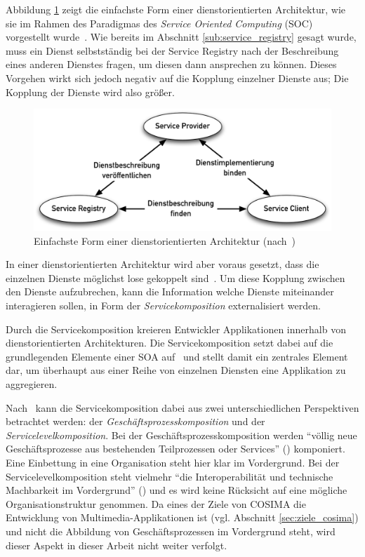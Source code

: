   Abbildung \ref{fig:images_Basic_SOA} zeigt die einfachste Form einer dienstorientierten Architektur, wie sie im Rahmen des Paradigmas des \emph{Service Oriented Computing} (SOC) vorgestellt wurde~\citep{service_oriented_computing}. Wie bereits im Abschnitt \ref{sub:service_registry} gesagt wurde, muss ein Dienst selbstständig bei der Service Registry nach der Beschreibung eines anderen Dienstes fragen, um diesen dann ansprechen zu können. Dieses Vorgehen wirkt sich jedoch negativ auf die Kopplung einzelner Dienste aus; Die Kopplung der Dienste wird also größer.
  
\begin{figure}[hb]
  \centering
    \includegraphics[width=.9\textwidth]{images/Basic_SOA.png}
  \caption{Einfachste Form einer dienstorientierten Architektur (nach~\citep{service_oriented_computing})}
  \label{fig:images_Basic_SOA}
\end{figure}

  In einer dienstorientierten Architektur wird aber voraus gesetzt, dass die einzelnen Dienste möglichst lose gekoppelt sind~\citep[S. 162]{soa_goes_real}. Um diese Kopplung zwischen den Dienste aufzubrechen, kann die Information welche Dienste miteinander interagieren sollen, in Form der \emph{Servicekomposition} externalisiert werden.

  Durch die Servicekomposition kreieren Entwickler Applikationen innerhalb von dienstorientierten Architekturen. Die Servicekomposition setzt dabei auf die grundlegenden Elemente einer SOA auf~\citep[S. 51]{milanovic2004csw} und stellt damit ein zentrales Element dar, um überhaupt aus einer Reihe von einzelnen Diensten eine Applikation zu aggregieren.
  
  Nach~\citep[S. 104]{masak2007ssb} kann die Servicekomposition dabei aus zwei unterschiedlichen Perspektiven betrachtet werden: der \emph{Geschäftsprozesskomposition} und der \emph{Servicelevelkomposition}. Bei der Geschäftsprozesskomposition werden "`völlig neue Geschäftsprozesse aus bestehenden Teilprozessen oder Services"' (\citep[S. 104]{masak2007ssb}) komponiert. Eine Einbettung in eine Organisation steht hier klar im Vordergrund. Bei der Servicelevelkomposition steht vielmehr "`die Interoperabilität und technische Machbarkeit im Vordergrund"' (\citep[S. 105]{masak2007ssb}) und es wird keine Rücksicht auf eine mögliche Organisationstruktur genommen. Da eines der Ziele von COSIMA die Entwicklung von Multimedia-Applikationen ist (vgl. Abschnitt \ref{sec:ziele_cosima}) und nicht die Abbildung von Geschäftsprozessen im Vordergrund steht, wird dieser Aspekt in dieser Arbeit nicht weiter verfolgt.
  
